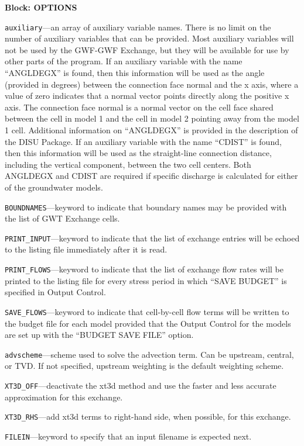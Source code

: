 
\item \textbf{Block: OPTIONS}

\begin{description}
\item \texttt{auxiliary}---an array of auxiliary variable names.  There is no limit on the number of auxiliary variables that can be provided. Most auxiliary variables will not be used by the GWF-GWF Exchange, but they will be available for use by other parts of the program.  If an auxiliary variable with the name ``ANGLDEGX'' is found, then this information will be used as the angle (provided in degrees) between the connection face normal and the x axis, where a value of zero indicates that a normal vector points directly along the positive x axis.  The connection face normal is a normal vector on the cell face shared between the cell in model 1 and the cell in model 2 pointing away from the model 1 cell.  Additional information on ``ANGLDEGX'' is provided in the description of the DISU Package.  If an auxiliary variable with the name ``CDIST'' is found, then this information will be used as the straight-line connection distance, including the vertical component, between the two cell centers.  Both ANGLDEGX and CDIST are required if specific discharge is calculated for either of the groundwater models.

\item \texttt{BOUNDNAMES}---keyword to indicate that boundary names may be provided with the list of GWT Exchange cells.

\item \texttt{PRINT\_INPUT}---keyword to indicate that the list of exchange entries will be echoed to the listing file immediately after it is read.

\item \texttt{PRINT\_FLOWS}---keyword to indicate that the list of exchange flow rates will be printed to the listing file for every stress period in which ``SAVE BUDGET'' is specified in Output Control.

\item \texttt{SAVE\_FLOWS}---keyword to indicate that cell-by-cell flow terms will be written to the budget file for each model provided that the Output Control for the models are set up with the ``BUDGET SAVE FILE'' option.

\item \texttt{advscheme}---scheme used to solve the advection term.  Can be upstream, central, or TVD.  If not specified, upstream weighting is the default weighting scheme.

\item \texttt{XT3D\_OFF}---deactivate the xt3d method and use the faster and less accurate approximation for this exchange.

\item \texttt{XT3D\_RHS}---add xt3d terms to right-hand side, when possible, for this exchange.

\item \texttt{FILEIN}---keyword to specify that an input filename is expected next.

\end{description}
